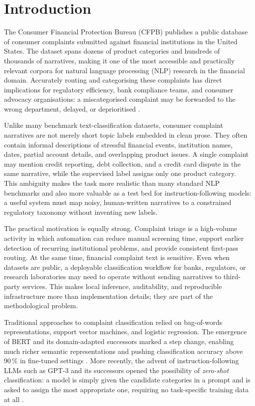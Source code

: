 \documentclass[journal]{IEEEtran}
\begin{document}
\section{Introduction}
\label{sec:intro}

The Consumer Financial Protection Bureau (CFPB) publishes a public
database of consumer complaints submitted against financial institutions
in the United States. The dataset spans dozens of product categories
and hundreds of thousands of narratives, making it one of the most
accessible and practically relevant corpora for natural language
processing (NLP) research in the financial domain. Accurately routing
and categorising these complaints has direct implications for
regulatory efficiency, bank compliance teams, and consumer advocacy
organisations: a miscategorised complaint may be forwarded to the wrong
department, delayed, or deprioritised
\cite{das2024explainable,liu2024framework,jondhale2024cfpb}.

Unlike many benchmark text-classification datasets, consumer complaint
narratives are not merely short topic labels embedded in clean prose.
They often contain informal descriptions of stressful financial events,
institution names, dates, partial account details, and overlapping
product issues. A single complaint may mention credit reporting, debt
collection, and a credit card dispute in the same narrative, while the
supervised label assigns only one product category. This ambiguity makes
the task more realistic than many standard NLP benchmarks and also more
valuable as a test bed for instruction-following models: a useful system
must map noisy, human-written narratives to a constrained regulatory
taxonomy without inventing new labels.

The practical motivation is equally strong. Complaint triage is a
high-volume activity in which automation can reduce manual screening
time, support earlier detection of recurring institutional problems,
and provide consistent first-pass routing. At the same time, financial
complaint text is sensitive. Even when datasets are public, a deployable
classification workflow for banks, regulators, or research laboratories
may need to operate without sending narratives to third-party services.
This makes local inference, auditability, and reproducible infrastructure
more than implementation details; they are part of the methodological
problem.

Traditional approaches to complaint classification relied on
bag-of-words representations, support vector machines, and logistic
regression. The emergence of BERT \cite{devlin2019bert} and its
domain-adapted successors marked a step change, enabling much richer
semantic representations and pushing classification accuracy above
90\,\% in fine-tuned settings \cite{vairetti2024bert}. More recently,
the advent of instruction-following LLMs such as GPT-3 \cite{brown2020gpt3}
and its successors opened the possibility of \emph{zero-shot}
classification: a model is simply given the candidate categories in
a prompt and is asked to assign the most appropriate one, requiring
no task-specific training data at all
\cite{kojima2022zeroshotcot,madanchian2024genai}.
\end{document}
